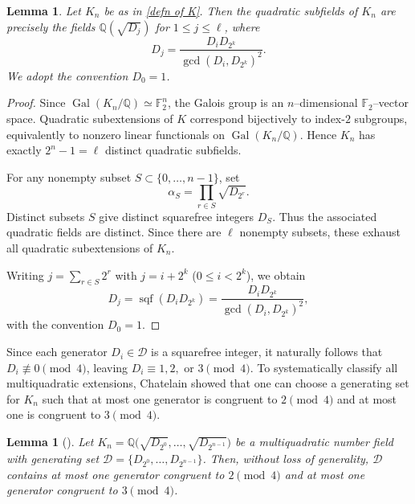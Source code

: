 \documentclass{amsart}
\newcommand{\Q}{\mathbb{Q}}
\newcommand{\F}{\mathbb{F}}
\newcommand{\op}[1]{\operatorname{#1}}
\theoremstyle{plain}
\newtheorem{lemma}[theorem]{Lemma}
\theoremstyle{definition}
\theoremstyle{remark}
\numberwithin{equation}{section}
\begin{document}
\begin{lemma}
Let $K_n$ be as in \eqref{defn of K}. Then the quadratic subfields of $K_n$ are precisely the fields $\Q(\sqrt{D_j})$ for $1\le j\le \ell$, where
\begin{equation}\label{eq:quadratic-subfields}
D_j=\frac{D_iD_{2^k}}{\gcd(D_i,D_{2^k})^2}.
\end{equation}
We adopt the convention $D_0=1$.
\end{lemma}
\begin{proof}
 
Since $\op{Gal}(K_n/\Q)\simeq \F_2^n$, the Galois group is an
$n$–dimensional $\mathbb F_2$–vector space.
Quadratic subextensions of $K$ correspond bijectively to
index-$2$ subgroups, equivalently to nonzero linear functionals
on $\op{Gal}(K_n/\Q)$.
Hence $K_n$ has exactly $2^n-1=\ell$ distinct quadratic subfields.

For any nonempty subset $S\subset\{0,\dots,n-1\}$,
set
\[
\alpha_S=\prod_{r\in S}\sqrt{D_{2^r}}.
\]
Distinct subsets $S$ give distinct squarefree integers $D_S$. Thus the associated quadratic fields are distinct. Since there are $\ell$ nonempty subsets, these exhaust all
quadratic subextensions of $K_n$.
\par Writing $j=\sum_{r\in S}2^r$ with
$j=i+2^k$ ($0\le i<2^k$),
we obtain
\[
D_j=\operatorname{sqf}(D_iD_{2^k})
=\frac{D_iD_{2^k}}{\gcd(D_i,D_{2^k})^2},
\]
with the convention $D_0=1$.
\end{proof}
Since each generator $D_i \in \mathcal{D}$ is a squarefree integer, it naturally follows that $D_i \not\equiv 0 \pmod 4$, leaving $D_i \equiv 1, 2,$ or $3 \pmod 4$. To systematically classify all multiquadratic extensions, Chatelain \cite{Chatelain} showed that one can choose a generating set for $K_n$ such that at most one generator is congruent to $2 \pmod 4$ and at most one is congruent to $3 \pmod 4$. 

\begin{lemma}[{\cite[p.~10]{Chatelain}}] \label{lem:generator_congruence}
    Let $K_n = \Q\bigl(\sqrt{D_{2^0}}, \ldots, \sqrt{D_{2^{n-1}}}\bigr)$ be a multiquadratic number field with generating set $\mathcal{D} = \{D_{2^0}, \ldots, D_{2^{n-1}}\}$. Then, without loss of generality, $\mathcal{D}$ contains at most one generator congruent to $2 \pmod 4$ and at most one generator congruent to $3 \pmod 4$.
\end{lemma}
\end{document}
